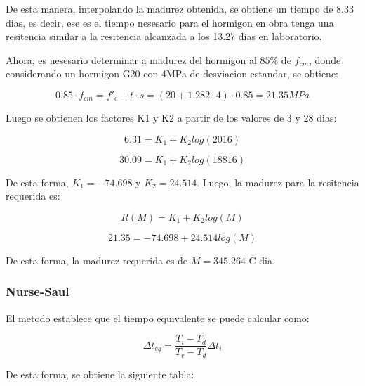 De esta manera, interpolando la madurez obtenida, se obtiene un tiempo de 8.33 dias, es decir, ese es el tiempo nesesario para el hormigon en obra tenga una resitencia similar a la resitencia alcanzada a los 13.27 dias en laboratorio.

Ahora, es nesesario determinar a madurez del hormigon al $85\%$ de $f_{cm}$, donde considerando un hormigon G20 con 4MPa de desviacion estandar, se obtiene:

\begin{equation}
    0.85 \cdot f_{cm} = f'_c + t \cdot s = (20 + 1.282 \cdot 4)\cdot 0.85 = 21.35 MPa
\end{equation}

Luego se obtienen los factores K1 y K2 a partir de los valores de 3 y 28 dias:

\begin{equation}
    6.31 = K_1 + K_2 log(2016)
\end{equation}

\begin{equation}
    30.09 = K_1 + K_2 log(18816)
\end{equation}

De esta forma, $K_1 = -74.698$ y $K_2 = 24.514$. Luego, la madurez para la resitencia requerida es:

\begin{equation}
    R(M) = K_1 + K_2 log(M)
\end{equation}

\begin{equation}
    21.35 = -74.698 + 24.514 log(M)
\end{equation}

De esta forma, la madurez requerida es de $M = 345.264$ C dia.

\subsubsection*{Nurse-Saul}

El metodo establece que el tiempo equivalente se puede calcular como:

\begin{equation}
    \Delta t_{eq} = \frac{T_i - T_d}{T_r - T_d} \Delta t_i
\end{equation}

De esta forma, se obtiene la siguiente tabla:

